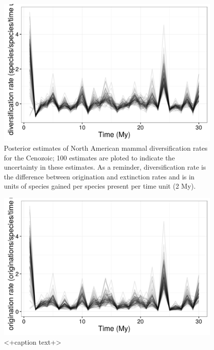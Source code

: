 \documentclass[12pt,letterpaper]{article}
\begin{document}
\begin{figure}[ht]
  \centering
  \includegraphics[width=\textwidth,height=0.8\textheight,keepaspectratio=true]{figure/div_rate}
  \caption[Mammal diversification rate estimtes]{Posterior estimates of North American mammal diversification rates for the Cenozoic; 100 estimates are ploted to indicate the uncertainty in these estimates. As a reminder, diversification rate is the difference between origination and extinction rates and is in units of species gained per species present per time unit (2 My).}
  \label{fig:diversity_rate}
\end{figure}

\begin{figure}[ht]
  \centering
  \includegraphics[width=\textwidth,height=0.8\textheight,keepaspectratio=true]{figure/orig_rate}
  \caption{<+caption text+>}
  \label{fig:origin_rate}
\end{figure}
\end{document}

